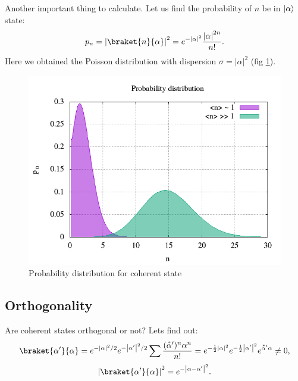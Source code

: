 Another important thing to calculate. Let us find the probability of $n$ be in $\lvert\alpha\rangle$ state:
\begin{equation}
	p_n = \left| \braket{n}{\alpha} \right|^2 = e^{- \left|\alpha\right|^2} \frac{\left|\alpha\right|^{2n}}{n!}.
\end{equation}
Here we obtained the Poisson distribution with dispersion $\sigma = \left|\alpha\right|^2$ (fig \ref{fig:2_1}).
\begin{figure}
	\centering
	\includegraphics[width=0.7\linewidth]{fig/L2/2_1}
	\caption{Probability distribution for coherent state}
	\label{fig:2_1}
\end{figure}

\subsection{Orthogonality}

Are coherent states orthogonal or not? Lets find out:
\begin{equation}
	\braket{\alpha'}{\alpha} = e^{- \left|\alpha\right|^2/2} e^{- \left|\alpha'\right|^2/2} \sum \frac{( \accentset{\ast}{\alpha}' )^n \alpha^n}{n!} = e^{-\frac{1}{2} \left|\alpha\right|^2} e^{-\frac{1}{2} \left|\alpha'\right|^2 } e^{\accentset{\ast}{\alpha}' \alpha} \neq 0,
\end{equation}
\begin{equation}
	\left|\braket{\alpha'}{\alpha}\right|^2 = e^{- \left| \alpha - \alpha' \right|^2}.
\end{equation}




